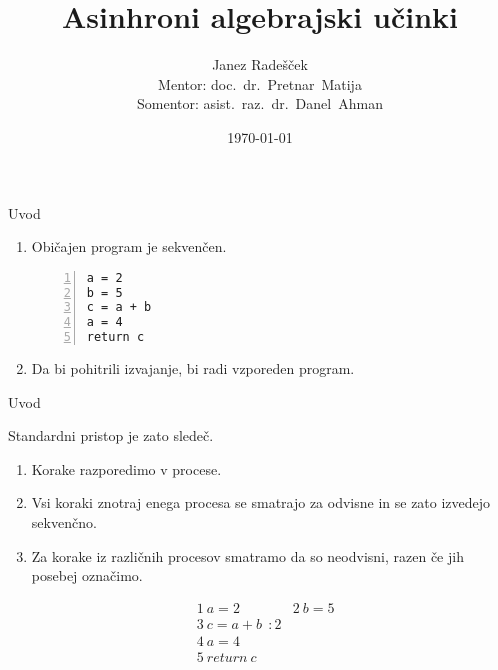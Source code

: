 \documentclass{beamer}
\theoremstyle{definition} %
\theoremstyle{plain} %
\begin{document}
	
	\title{Asinhroni algebrajski učinki}
	\author[Janez Radešček]{Janez Radešček \\[3mm] Mentor: doc.~dr.~Pretnar~Matija\\[3mm] Somentor: asist.~raz.~dr.~Danel~Ahman}
	\date{\today}
	
	\frame{\titlepage}
	
	
	
	
	\begin{frame}[fragile]{Uvod}
		\begin{enumerate}
			\item<1-> Običajen program je sekvenčen. 
		\begin{lstlisting}[numbers=left]
a = 2
b = 5
c = a + b
a = 4
return c
		\end{lstlisting}
			\item<2-> Da bi pohitrili izvajanje, bi radi vzporeden program.

	\end{enumerate}
		
		
		

		
	\end{frame}


	\begin{frame}[fragile]{Uvod}
		
		Standardni pristop je zato sledeč.
		\begin{enumerate}
			\item Korake razporedimo v procese.
			\item Vsi koraki znotraj enega procesa se smatrajo za odvisne in se zato izvedejo sekvenčno.
			\item Za korake iz različnih procesov smatramo da so neodvisni, razen če jih posebej označimo.
		\end{enumerate}
	
		\begin{align*}
		&1\ a = 2       &2\ b = 5 \\
		&3\ c = a + b\ \ : 2& \\
		&4\ a = 4      &\\
		&5\ return\ c   &\\
		\end{align*}
	
		
	\end{frame}
\end{document}
